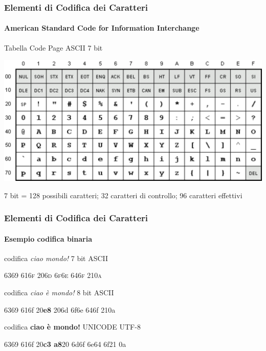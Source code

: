 \begin{frame}
	\frametitle{Elementi di Codifica dei Caratteri}
	\framesubtitle{American Standard Code for Information Interchange}
	\addtocounter{nframe}{1}

	\begin{block}{Tabella Code Page ASCII 7 bit}
		\begin{center}
			\includegraphics[width=.9\textwidth]{imgs/ascii-67.pdf}
		\end{center}

	\end{block}
	\begin{tiny}
		\begin{center}
			7 bit = 128 possibili caratteri; 32 caratteri di controllo; 96 caratteri effettivi
		\end{center}

	\end{tiny}

\end{frame}

\begin{frame}
	\frametitle{Elementi di Codifica dei Caratteri}
	\framesubtitle{Esempio codifica binaria}
	\addtocounter{nframe}{1}

	\begin{block}{codifica \textit{ciao mondo!} 7 bit ASCII}
		\begin{center}
			\textsc{6369 616f 206d 6f6e 646f 210a}
		\end{center}
	\end{block}

	\begin{block}{codifica \textit{ciao è mondo!} 8 bit ASCII}
		\begin{center}
			\textmd{6369 616f 20\textbf{e8} 206d 6f6e 646f 210a       }
		\end{center}
	\end{block}

	\begin{block}{codifica \textbf{ciao è mondo!} UNICODE UTF-8}
		\begin{center}
			6369 616f 20\textbf{c3 a8}20 6d6f 6e64 6f21 0a
		\end{center}
	\end{block}

\end{frame}

